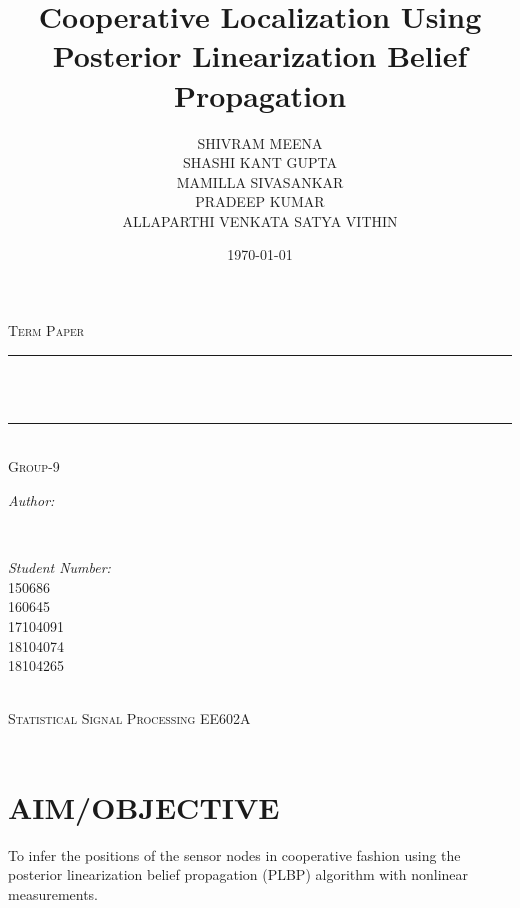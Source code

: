 \documentclass[12pt]{article}
\title{Cooperative Localization Using Posterior Linearization Belief Propagation}								%
\author{SHIVRAM MEENA\\ 
		SHASHI KANT GUPTA \\
		MAMILLA SIVASANKAR \\
		PRADEEP KUMAR \\
		ALLAPARTHI VENKATA SATYA VITHIN \\}								%
\date{\today}											%
\makeatletter
\let\thetitle\@title
\let\theauthor\@author
\let\thedate\@date
\makeatother
\begin{document}

\begin{titlepage}
	\centering
    \vspace*{0.5 cm}

	\textsc{\Large Term Paper}\\[0.5 cm]				%
	\rule{\linewidth}{0.2 mm} \\[0.4 cm]
	{ \huge  \thetitle}\\
	\rule{\linewidth}{0.2 mm} \\[4 cm]
	\textsc{\large Group-9}\\[0.5 cm]
	\begin{minipage}{0.7\textwidth}
		\begin{flushleft} \large
			\emph{Author:}\\
			\theauthor
			\end{flushleft}
			\end{minipage}~
			\begin{minipage}{0.4\textwidth}
			\begin{flushright} \large
			\emph{Student Number:} \\
			150686 \\
160645 \\
17104091 \\
18104074 \\
18104265\\							%
		\end{flushright}
	\end{minipage}\\[2 cm]
	\textsc{\large Statistical Signal Processing EE602A}\\[0.5 cm]
	{\large \thedate}\\[2 cm]
 
	\vfill
	
\end{titlepage}


\tableofcontents
\pagebreak


\section{AIM/OBJECTIVE}
  To infer the positions of the sensor nodes in cooperative fashion using the posterior linearization belief propagation (PLBP) algorithm with nonlinear measurements.
\end{document}
